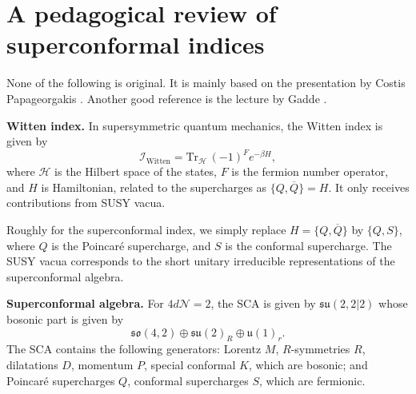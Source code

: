 \documentclass[a4paper,11pt]{article}
\begin{document}
\section{A pedagogical review of superconformal indices}
None of the following is original. It is mainly based on the presentation by Costis Papageorgakis \cite{Costis}. Another good reference is the lecture by Gadde \cite{Gadde:2020yah}.

\bigskip
\noindent\textbf{Witten index.} In supersymmetric quantum mechanics, the Witten index is given by
\begin{equation}
    \mathcal{I}_\mathrm{Witten} = \mathrm{Tr}_\mathcal{H}\, (-1)^F e^{-\beta H},
\end{equation}
where $\mathcal{H}$ is the Hilbert space of the states, $F$ is the fermion number operator, and $H$ is Hamiltonian, related to the supercharges as $\{Q, \overline{Q}\} = H$. It only receives contributions from SUSY vacua.

Roughly for the superconformal index, we simply replace $H = \{Q, \overline{Q}\}$ by $\{Q, S\}$, where $Q$ is the Poincar\'{e} supercharge, and $S$ is the conformal supercharge. The SUSY vacua corresponds to the short unitary irreducible representations of the superconformal algebra.

\bigskip
\noindent\textbf{Superconformal algebra.}
For $4d \mathcal{N}=2$, the SCA is given by $\mathfrak{su}(2,2|2)$ whose bosonic part is given by
$$
\mathfrak{so}(4,2)  \oplus \mathfrak{su}(2)_R \oplus \mathfrak{u}(1)_r.
$$
The SCA contains the following generators:
Lorentz $M$, $R$-symmetries $R$, dilatations $D$, momentum $P$, special conformal $K$, which are bosonic; and Poincar\'{e} supercharges $Q$, conformal supercharges $S$, which are fermionic.
\end{document}
